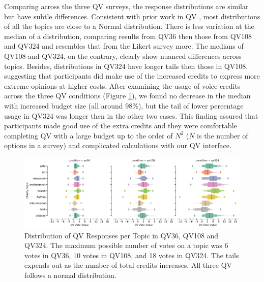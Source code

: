 Comparing across the three QV surveys, 
the response distributions are similar 
but have subtle differences. 
Consistent with prior work in QV \cite{quarfoot2017quadratic}, 
most distributions of all the topics 
are close to a Normal distribution.
There is less variation
at the median of a distribution, 
comparing results from QV36 
then those from QV108 and QV324
and resembles that from the Likert survey more.
The medians of QV108 and QV324, on the contrary, 
clearly show nuanced differences across topics. 
Besides, distributions in QV324 
have longer tails 
then those in QV108, 
suggesting that participants 
did make use of the increased credits 
to express more extreme opinions at higher costs. 
After examining
the usage of 
voice credits across the three QV conditions 
(Figure \ref{fig:qv3_exp1}), 
we found no decrease 
in the median with increased budget size (all around 98\%), 
but the tail of lower percentage usage in QV324 was longer 
then in the other two cases. 
This finding assured that 
participants made good use of 
the extra credits 
and they were comfortable 
completing QV with a large budget 
up to the order of $N^2$ ($N$ is the number of options in a survey) 
and complicated calculations with our QV interface. 

\begin{figure}[htpb]
    \centering
    \includegraphics[width=\textwidth, keepaspectratio=true]{content/image/qv_distribution_per_topic.pdf}
    \caption{
      Distribution of QV Responses per Topic in QV36, QV108 and QV324. 
      The maximum possible number of votes on a topic was 6 votes in QV36, 10 votes in QV108, and 18 votes in QV324.
      The tails expends out as the number of total credits increases. 
      All three QV follows a normal distribution.
    }
    \label{fig:qv3_exp1}
\end{figure}

